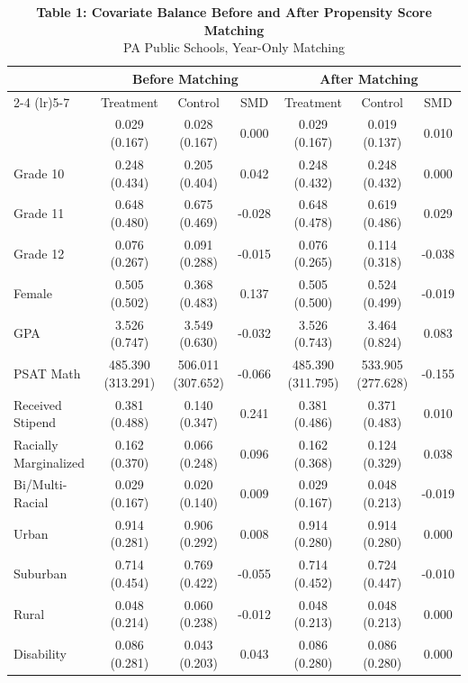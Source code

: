\begin{table}[t]
\caption*{
{\fontsize{10}{12}\selectfont  \textbf{Table 1: Covariate Balance Before and After Propensity Score Matching}\fontsize{8}{10}\selectfont } \\ 
{\fontsize{8}{10}\selectfont  PA Public Schools, Year-Only Matching\fontsize{8}{10}\selectfont }
} 
\fontsize{8.0pt}{10.0pt}\selectfont
\begin{tabular*}{\linewidth}{@{\extracolsep{\fill}}lcccccc}
\toprule
 & \multicolumn{3}{c}{Before Matching} & \multicolumn{3}{c}{After Matching} \\ 
\cmidrule(lr){2-4} \cmidrule(lr){5-7}
 & Treatment & Control & SMD & Treatment & Control & SMD \\ 
\midrule\addlinespace[2.5pt]
{Grade 9} & {0.029 (0.167)} & {0.028 (0.167)} & {0.000} & {0.029 (0.167)} & {0.019 (0.137)} & {0.010} \\ 
Grade 10 & 0.248 (0.434) & 0.205 (0.404) & 0.042 & 0.248 (0.432) & 0.248 (0.432) & 0.000 \\ 
Grade 11 & 0.648 (0.480) & 0.675 (0.469) & -0.028 & 0.648 (0.478) & 0.619 (0.486) & 0.029 \\ 
Grade 12 & 0.076 (0.267) & 0.091 (0.288) & -0.015 & 0.076 (0.265) & 0.114 (0.318) & -0.038 \\ 
Female & 0.505 (0.502) & 0.368 (0.483) & 0.137 & 0.505 (0.500) & 0.524 (0.499) & -0.019 \\ 
GPA & 3.526 (0.747) & 3.549 (0.630) & -0.032 & 3.526 (0.743) & 3.464 (0.824) & 0.083 \\ 
PSAT Math & 485.390 (313.291) & 506.011 (307.652) & -0.066 & 485.390 (311.795) & 533.905 (277.628) & -0.155 \\ 
Received Stipend & 0.381 (0.488) & 0.140 (0.347) & 0.241 & 0.381 (0.486) & 0.371 (0.483) & 0.010 \\ 
Racially Marginalized & 0.162 (0.370) & 0.066 (0.248) & 0.096 & 0.162 (0.368) & 0.124 (0.329) & 0.038 \\ 
Bi/Multi-Racial & 0.029 (0.167) & 0.020 (0.140) & 0.009 & 0.029 (0.167) & 0.048 (0.213) & -0.019 \\ 
Urban & 0.914 (0.281) & 0.906 (0.292) & 0.008 & 0.914 (0.280) & 0.914 (0.280) & 0.000 \\ 
Suburban & 0.714 (0.454) & 0.769 (0.422) & -0.055 & 0.714 (0.452) & 0.724 (0.447) & -0.010 \\ 
Rural & 0.048 (0.214) & 0.060 (0.238) & -0.012 & 0.048 (0.213) & 0.048 (0.213) & 0.000 \\ 
Disability & 0.086 (0.281) & 0.043 (0.203) & 0.043 & 0.086 (0.280) & 0.086 (0.280) & 0.000 \\ 

\end{tabular*}
\end{table}

